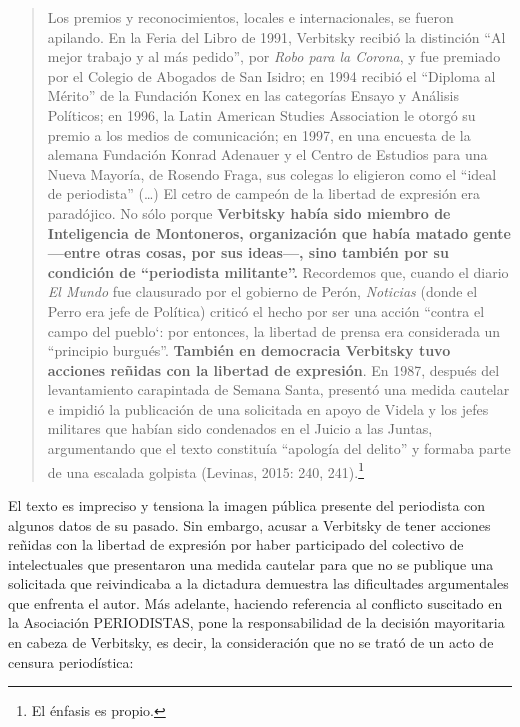 \begin{quote}
Los premios y reconocimientos, locales e internacionales, se fueron apilando. En la Feria del Libro de 1991, Verbitsky recibió la distinción \enquote{Al mejor trabajo y al más pedido}, por \emph{Robo para la Corona}, y fue premiado por el Colegio de Abogados de San Isidro; en 1994 recibió el \enquote{Diploma al Mérito} de la Fundación Konex en las categorías Ensayo y Análisis Políticos; en 1996, la Latin American Studies Association le otorgó su premio a los medios de comunicación; en 1997, en una encuesta de la alemana Fundación Konrad Adenauer y el Centro de Estudios para una Nueva Mayoría, de Rosendo Fraga, sus colegas lo eligieron como el \enquote{ideal de periodista} (\ldots) El cetro de campeón de la libertad de expresión era paradójico. No sólo porque \textbf{Verbitsky había sido miembro de Inteligencia de Montoneros, organización que había matado gente ---entre otras cosas, por sus ideas---, sino también por su condición de \enquote{periodista militante}.} Recordemos que, cuando el diario \emph{El Mundo} fue clausurado por el gobierno de Perón, \emph{Noticias} (donde el Perro era jefe de Política) criticó el hecho por ser una acción ``contra el campo del pueblo`: por entonces, la libertad de prensa era considerada un \enquote{principio burgués}. \textbf{También en democracia Verbitsky tuvo acciones reñidas con la libertad de expresión}. En 1987, después del levantamiento carapintada de Semana Santa, presentó una medida cautelar e impidió la publicación de una solicitada en apoyo de Videla y los jefes militares que habían sido condenados en el Juicio a las Juntas, argumentando que el texto constituía \enquote{apología del delito} y formaba parte de una escalada golpista (Levinas, 2015: 240, 241).\footnote{El énfasis es propio.}
\end{quote}

El texto es impreciso y tensiona la imagen pública presente del periodista con algunos datos de su pasado. Sin embargo, acusar a Verbitsky de tener acciones reñidas con la libertad de expresión por haber participado del colectivo de intelectuales que presentaron una medida cautelar para que no se publique una solicitada que reivindicaba a la dictadura demuestra las dificultades argumentales que enfrenta el autor. Más adelante, haciendo referencia al conflicto suscitado en la Asociación PERIODISTAS, pone la responsabilidad de la decisión mayoritaria en cabeza de Verbitsky, es decir, la consideración que no se trató de un acto de censura periodística:

